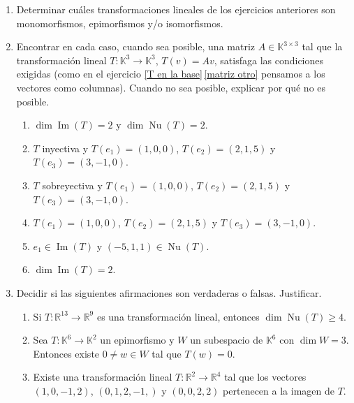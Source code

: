 \begin{enumerate}[topsep=6pt, itemsep=.4cm]
    \rta
    
    
    \item Determinar cuáles transformaciones lineales de los ejercicios anteriores son monomorfismos, epimorfismos y/o isomorfismos.
    
    \rta


    \item\label{usar-1} Encontrar en cada caso, cuando sea posible, una matriz $A\in\mathbb{K}^{3\times 3}$ tal que la transformación lineal $T:\mathbb{K}^3\longrightarrow\mathbb{K}^3$, $T(v)=Av$, satisfaga las condiciones exigidas (como en el ejercicio  \ref{T en la base}\,\ref{matriz otro} pensamos a los vectores como columnas). Cuando no sea posible, explicar por qué no es posible.
    \begin{enumerate}[ topsep=5pt,itemsep=5pt]
        \item\label{usar-1 a} $\operatorname{dim} \operatorname{Im}(T)=2$ y $\operatorname{dim}\operatorname{Nu}(T)=2$.
        \item\label{usar-1 b} $T$ inyectiva y $T(e_1)=(1,0,0)$, $T(e_2)=(2,1,5)$ y $T(e_3)=(3,-1,0)$.
        \item\label{usar-1 c} $T$ sobreyectiva y $T(e_1)=(1,0,0)$, $T(e_2)=(2,1,5)$ y $T(e_3)=(3,-1,0)$.
        
        \item\label{usar Txyz} $T(e_1)=(1,0,0)$, $T(e_2)=(2,1,5)$ y $T(e_3)=(3,-1,0)$.
        
        \item\label{usar-1 e} $e_1\in\operatorname{Im}(T)$ y $(-5,1,1)\in\operatorname{Nu}(T)$.
        
        \item\label{usar-1 f} $\operatorname{dim} \operatorname{Im}(T)=2$.
    \end{enumerate}
        
    \rta 


    \item Decidir si las siguientes afirmaciones son verdaderas o falsas. Justificar.
    \begin{enumerate}
        \item\label{tl-VoF-a} Si $T : \mathbb R^{13} \to \mathbb R^9$ es una transformación lineal, entonces $\dim \operatorname{Nu}(T) \geq  4$.
        \item\label{tl-VoF-b} Sea $T:\mathbb{K}^{6}\longrightarrow\mathbb{K}^2$ un epimorfismo y $W$ un subespacio de $\mathbb{K}^{6}$ con $\dim W=3$. Entonces existe $0\neq w\in W$ tal que $T(w)=0$.
        \item\label{tl-VoF-c} Existe una transformación lineal $T : \mathbb R^2 \to \mathbb R^4$ tal que los vectores $(1, 0, -1, 2)$, $(0, 1, 2,-1,)$ y $(0, 0, 2, 2)$ pertenecen a la imagen de $T$.
    \end{enumerate}
    

\end{enumerate}
